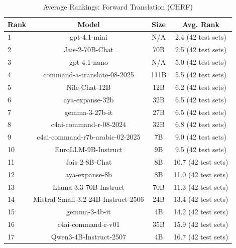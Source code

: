 \begin{table}[htbp]
\centering
\caption{Average Rankings: Forward Translation (CHRF)}
\label{tab:avg_rankings_chrf}
\begin{tabular}{l@{\hspace{3pt}}c@{\hspace{3pt}}c@{\hspace{3pt}}c}
\toprule
Rank & Model & Size & Avg. Rank \\
\midrule
1 & gpt-4.1-mini & N/A & 2.4 (42 test sets) \\
2 & Jais-2-70B-Chat & 70B & 2.5 (42 test sets) \\
3 & gpt-4.1-nano & N/A & 5.0 (42 test sets) \\
4 & command-a-translate-08-2025 & 111B & 5.5 (42 test sets) \\
5 & Nile-Chat-12B & 12B & 6.2 (42 test sets) \\
6 & aya-expanse-32b & 32B & 6.5 (42 test sets) \\
7 & gemma-3-27b-it & 27B & 6.5 (42 test sets) \\
8 & c4ai-command-r-08-2024 & 32B & 6.8 (42 test sets) \\
9 & c4ai-command-r7b-arabic-02-2025 & 7B & 9.0 (42 test sets) \\
10 & EuroLLM-9B-Instruct & 9B & 9.5 (42 test sets) \\
11 & Jais-2-8B-Chat & 8B & 10.7 (42 test sets) \\
12 & aya-expanse-8b & 8B & 11.0 (42 test sets) \\
13 & Llama-3.3-70B-Instruct & 70B & 11.3 (42 test sets) \\
14 & Mistral-Small-3.2-24B-Instruct-2506 & 24B & 13.4 (42 test sets) \\
15 & gemma-3-4b-it & 4B & 14.2 (42 test sets) \\
16 & c4ai-command-r-v01 & 35B & 15.9 (42 test sets) \\
17 & Qwen3-4B-Instruct-2507 & 4B & 16.7 (42 test sets) \\
\bottomrule
\end{tabular}
\end{table}